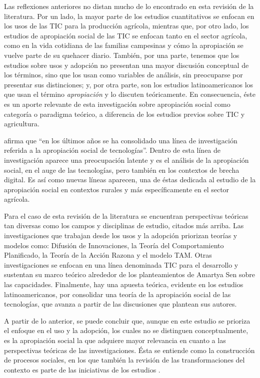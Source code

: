 \documentclass[spanish]{textolivre}
\begin{document}
Las reflexiones anteriores no distan mucho de lo encontrado en esta revisión de la literatura. Por un lado, la mayor parte de los estudios cuantitativos se enfocan en los usos de las TIC para la producción agrícola, mientras que, por otro lado, los estudios de apropiación social de las TIC se enfocan tanto en el sector agrícola, como en la vida cotidiana de las familias campesinas y cómo la apropiación se vuelve parte de su quehacer diario. También, por una parte, tenemos que los estudios sobre usos y adopción no presentan una mayor discusión conceptual de los términos, sino que los usan como variables de análisis, sin preocuparse por presentar sus distinciones; y, por otra parte, son los estudios latinoamericanos los que usan el término \textit{apropiación} y lo discuten teóricamente. En consecuencia, éste es un aporte relevante de esta investigación sobre apropiación social como categoría o paradigma teórico, a diferencia de los estudios previos sobre TIC y agricultura. 

\textcite[p. 18]{andres_aproximacion_2014} afirma que “en los últimos años se ha consolidado una línea de investigación referida a la apropiación social de tecnologías”. Dentro de esta línea de investigación aparece una preocupación latente y es el análisis de la apropiación social, en el auge de las tecnologías, pero también en los contextos de brecha digital. Es así como nuevas líneas aparecen, una de éstas dedicada al estudio de la apropiación social en contextos rurales y más específicamente en el sector agrícola.

Para el caso de esta revisión de la literatura se encuentran perspectivas teóricas tan diversas como los campos y disciplinas de estudio, citados más arriba. Las investigaciones que trabajan desde los usos y la adopción priorizan teorías y modelos como: Difusión de Innovaciones, la Teoría del Comportamiento Planificado, la Teoría de la Acción Razona y el modelo TAM. Otras investigaciones se enfocan en una línea denominada TIC para el desarrollo y sustentan su marco teórico alrededor de los planteamientos de Amartya Sen sobre las capacidades. Finalmente, hay una apuesta teórica, evidente en los estudios latinoamericanos, por consolidar una teoría de la apropiación social de las tecnologías, que avanza a partir de las discusiones que plantean sus autores.

A partir de lo anterior, se puede concluir que, aunque en este estudio se prioriza el enfoque en el uso y la adopción, los cuales no se distinguen conceptualmente, es la apropiación social la que adquiere mayor relevancia en cuanto a las perspectivas teóricas de las investigaciones. Ésta se entiende como la construcción de procesos sociales, en los que también la revisión de las transformaciones del contexto es parte de las iniciativas de los estudios \cite{zapata_-_cardenas_ruralidad_2015,bonilla_lugo_capacitacion_2016}.
\end{document}
